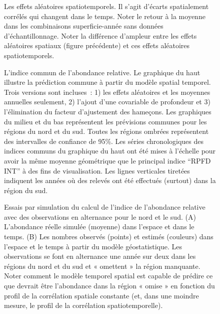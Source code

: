 \documentclass[11pt]{book}
\begin{document}
\begin{figure}[htb]

{\centering {} 

}

\caption{Les effets aléatoires spatiotemporels. Il s’agit d’écarts spatialement corrélés qui changent dans le temps. Noter le retour à la moyenne dans les combinaisons superficie-année sans données d’échantillonnage. Noter la différence d’ampleur entre les effets aléatoires spatiaux (figure précédente) et ces effets aléatoires spatiotemporels.}\label{fig:hbll-spatiotemporal-re}
\end{figure}
\begin{figure}[htb]

{\centering {} 

}

\caption{L’indice commun de l’abondance relative. Le graphique du haut illustre la prédiction commune à partir du modèle spatial temporel. Trois versions sont incluses~: 1) les effets aléatoires et les moyennes annuelles seulement, 2) l’ajout d’une covariable de profondeur et 3) l’élimination du facteur d’ajustement des hameçons. Les graphiques du milieu et du bas représentent les prévisions communes pour les régions du nord et du sud. Toutes les régions ombrées représentent des intervalles de confiance de 95\%. Les séries chronologiques des indices communs du graphique du haut ont été mises à l’échelle pour avoir la même moyenne géométrique que le principal indice ``RPFD INT'' à des fins de visualisation. Les lignes verticales tiretées indiquent les années où des relevés ont été effectués (surtout) dans la région du sud.}\label{fig:hbll-index}
\end{figure}
\clearpage
\begin{figure}[htb]

{\centering {} 

}

\caption{Essais par simulation du calcul de l’indice de l’abondance relative avec des observations en alternance pour le nord et le sud. (A) L’abondance réelle simulée (moyenne) dans l’espace et dans le temps. (B) Les nombres observés (points) et estimés (couleurs) dans l’espace et le temps à partir du modèle géostatistique. Les observations se font en alternance une année sur deux dans les régions du nord et du sud et « omettent » la région manquante. Noter comment le modèle temporel spatial est capable de prédire ce que devrait être l’abondance dans la région « omise » en fonction du profil de la corrélation spatiale constante (et, dans une moindre mesure, le profil de la corrélation spatiotemporelle).}\label{fig:stich-sim-pred}
\end{figure}
\end{document}
